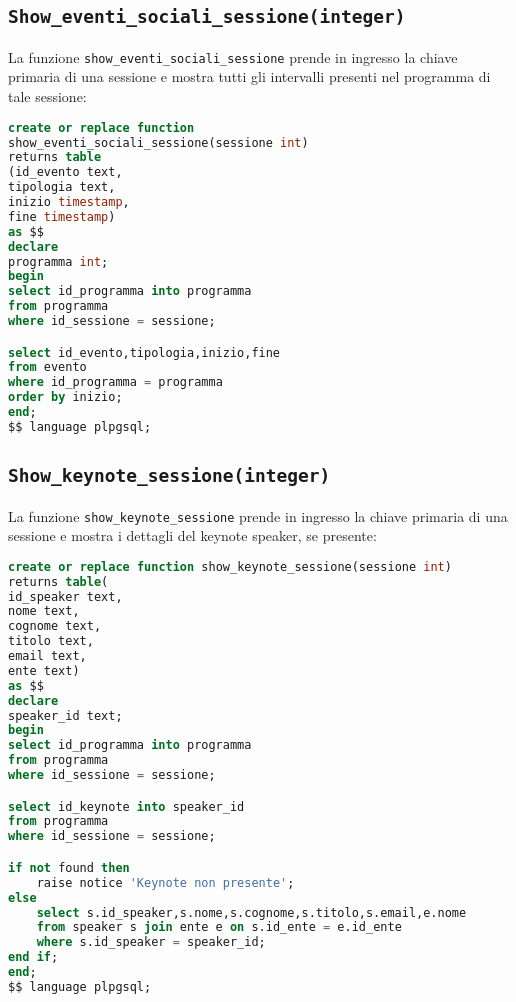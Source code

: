 \subsection{\texttt{Show\_eventi\_sociali\_sessione(integer)}}
La funzione \texttt{show\_eventi\_sociali\_sessione} prende in ingresso la chiave primaria di una sessione e mostra tutti gli intervalli presenti nel programma di tale sessione:
\begin{lstlisting}[language=SQL,style=mystyle]
create or replace function 
show_eventi_sociali_sessione(sessione int)
returns table
(id_evento text,
tipologia text,
inizio timestamp,
fine timestamp) 
as $$
declare 
programma int;
begin
select id_programma into programma
from programma
where id_sessione = sessione;

select id_evento,tipologia,inizio,fine
from evento
where id_programma = programma
order by inizio;
end;
$$ language plpgsql;
\end{lstlisting}
\subsection{\texttt{Show\_keynote\_sessione(integer)}}
La funzione \texttt{show\_keynote\_sessione} prende in ingresso la chiave primaria di una sessione e mostra i dettagli del keynote speaker, se presente:
\begin{lstlisting}[language=SQL,style=mystyle]
create or replace function show_keynote_sessione(sessione int)
returns table(
id_speaker text,
nome text,
cognome text,
titolo text,
email text,
ente text) 
as $$
declare
speaker_id text;
begin
select id_programma into programma
from programma
where id_sessione = sessione;

select id_keynote into speaker_id
from programma
where id_sessione = sessione;

if not found then
	raise notice 'Keynote non presente';
else
	select s.id_speaker,s.nome,s.cognome,s.titolo,s.email,e.nome
	from speaker s join ente e on s.id_ente = e.id_ente
	where s.id_speaker = speaker_id;
end if;
end;
$$ language plpgsql;
\end{lstlisting}
